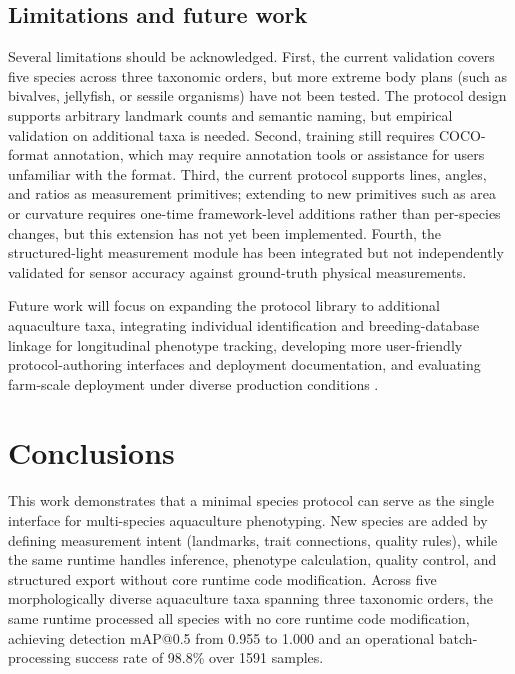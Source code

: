 \documentclass[final,3p,times]{elsarticle}
\begin{document}
\subsection{Limitations and future work}

Several limitations should be acknowledged. First, the current validation covers five species across three taxonomic orders, but more extreme body plans (such as bivalves, jellyfish, or sessile organisms) have not been tested. The protocol design supports arbitrary landmark counts and semantic naming, but empirical validation on additional taxa is needed. Second, training still requires COCO-format annotation, which may require annotation tools or assistance for users unfamiliar with the format. Third, the current protocol supports lines, angles, and ratios as measurement primitives; extending to new primitives such as area or curvature requires one-time framework-level additions rather than per-species changes, but this extension has not yet been implemented. Fourth, the structured-light measurement module has been integrated but not independently validated for sensor accuracy against ground-truth physical measurements.

Future work will focus on expanding the protocol library to additional aquaculture taxa, integrating individual identification \citep{zhang2026fishfaceid} and breeding-database linkage for longitudinal phenotype tracking, developing more user-friendly protocol-authoring interfaces and deployment documentation, and evaluating farm-scale deployment under diverse production conditions \citep{tonachella2022fishial}.

\section{Conclusions}

This work demonstrates that a minimal species protocol can serve as the single interface for multi-species aquaculture phenotyping. New species are added by defining measurement intent (landmarks, trait connections, quality rules), while the same runtime handles inference, phenotype calculation, quality control, and structured export without core runtime code modification. Across five morphologically diverse aquaculture taxa spanning three taxonomic orders, the same runtime processed all species with no core runtime code modification, achieving detection mAP@0.5 from 0.955 to 1.000 and an operational batch-processing success rate of 98.8\% over 1591 samples.
\end{document}
